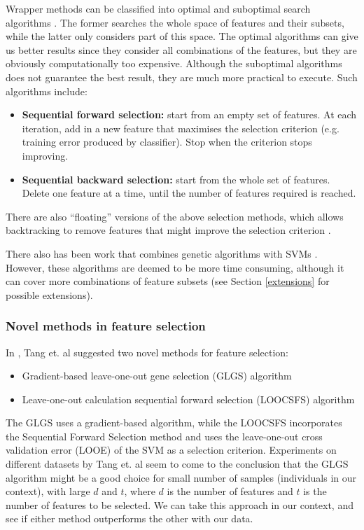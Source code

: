 \documentclass[12pt, twoside, a4paper]{article}
\begin{document}
Wrapper methods can be classified into optimal and suboptimal search algorithms \cite{RefWorks:120}. The former searches the whole space of features and their subsets, while the latter only considers part of this space. The optimal algorithms can give us better results since they consider all combinations of the features, but they are obviously computationally too expensive. Although the suboptimal algorithms does not guarantee the best result, they are much more practical to execute. Such algorithms include:
\begin{itemize}
\item \textbf{Sequential forward selection:} start from an empty set of features. At each iteration, add in a new feature that maximises the selection criterion (e.g. training error produced by classifier). Stop when the criterion stops improving.
\item \textbf{Sequential backward selection:} start from the whole set of features. Delete one feature at a time, until the number of features required is reached.
\end{itemize}

There are also ``floating'' versions of the above selection methods, which allows backtracking to remove features that might improve the selection criterion \cite{RefWorks:121}.

There also has been work that combines genetic algorithms with SVMs \cite{RefWorks:120}. However, these algorithms are deemed to be more time consuming, although it can cover more combinations of feature subsets (see Section \ref{extensions} for possible extensions).

\subsubsection{Novel methods in feature selection} \label{bg_GLGS}
In \cite{RefWorks:119}, Tang et. al suggested two novel methods for feature selection:
\begin{itemize}
\item Gradient-based leave-one-out gene selection (GLGS) algorithm
\item Leave-one-out calculation sequential forward selection (LOOCSFS) algorithm
\end{itemize}

The GLGS uses a gradient-based algorithm, while the LOOCSFS incorporates the Sequential Forward Selection method and uses the leave-one-out cross validation error (LOOE) of the SVM as a selection criterion. Experiments on different datasets by Tang et. al seem to come to the conclusion that the GLGS algorithm might be a good choice for small number of samples (individuals in our context), with large $d$ and $t$, where $d$ is the number of features and $t$ is the number of features to be selected. We can take this approach in our context, and see if either method outperforms the other with our data.
\end{document}

